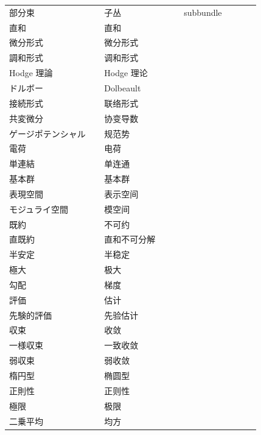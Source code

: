 {\begin{longtable}{p{0.31\linewidth} p{0.26\linewidth} p{0.25\linewidth}}
部分束 & 子丛 & subbundle \\
直和 & 直和 &  \\
微分形式 & 微分形式 &  \\
調和形式 & 调和形式 &  \\
Hodge 理論 & Hodge 理论 &  \\
ドルボー & Dolbeault &  \\
接続形式 & 联络形式 &  \\
共変微分 & 协变导数 &  \\
ゲージポテンシャル & 规范势 &  \\
電荷 & 电荷 &  \\
単連結 & 单连通 &  \\
基本群 & 基本群 &  \\
表現空間 & 表示空间 &  \\
モジュライ空間 & 模空间 &  \\
既約 & 不可约 &  \\
直既約 & 直和不可分解 &  \\
半安定 & 半稳定 &  \\
極大 & 极大 &  \\
勾配 & 梯度 &  \\
評価 & 估计 &  \\
先験的評価 & 先验估计 &  \\
収束 & 收敛 &  \\
一様収束 & 一致收敛 &  \\
弱収束 & 弱收敛 &  \\
楕円型 & 椭圆型 &  \\
正則性 & 正则性 &  \\
極限 & 极限 &  \\
二乗平均 & 均方 &  \\
\bottomrule
\end{longtable}
}


